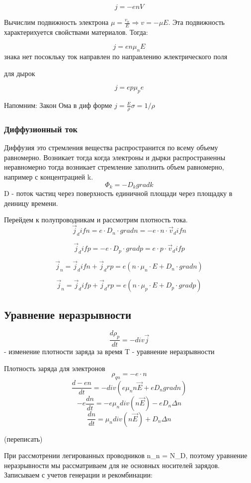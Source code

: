\documentclass[../main.tex]{subfiles}
\begin{document}
\[j = -e n V\]

Вычислим подвижность электрона $\mu = \frac{v_n}{E} \Rightarrow v = - \mu E$. Эта подвижность характерихуется свойствами материалов. Тогда:

\[j = e n \mu_n E\] 
знака нет посокльку ток направлен по направлению жлектрического поля

для дырок

\[j = e p \mu_p e\]

Напомним: Закон Ома в диф форме $j = \frac{E}{\rho} \sigma = 1/\rho$

\subsubsection{Диффузионный ток}
Диффузия это стремления вещества распространится по всему объему равномерно. Возникает тогда когда электроны и дырки распространенны неравномерно
тогда возникает стремление заполнить объем равномерно, например с концентрацией k.
\[\Phi_k = -D_k grad k\]
D - поток частиц через поверхность единичной площади через площадку в деиницу времени.

Перейдем к полупроводникам и рассмотрим плотность тока.
\[\vec j_difn = e \cdot D_n \cdot grad n = -e \cdot n \cdot \vec v_difn \]

\[\vec j_difp = - e \cdot D_p \cdot grad p = e \cdot p \cdot \vec v_difp\]

\[\vec j_n = \vec j_difn + \vec j_drp = e(n \cdot \mu_n \cdot E + D_n \cdot grad n)\]

\[\vec j_n = \vec j_difp + \vec j_drp = e(n \cdot \mu_p \cdot E + D_p \cdot grad p)\]

\subsection{Уравнение неразрывности}
\[\frac{d \rho_p}{d t} = -div \vec j\]
- изменение плотности заряда за время T - уравнение неразрывности

Плотность заряда для электронов
\[\rho_{qn} = - e \cdot n\]
\[\frac{d -en}{d t} = -div(e \mu_n n \vec E + e D_n grad n)\]
\[-e \frac{d n}{d t} = -e \mu_n div(n \vec E) - eD_n \Delta n\]
\[\frac{d n}{d t} = \mu_n div(n \vec E) + D_n \Delta n\]

(переписать)

При рассмотрении легированных проводников n_n = N_D, поэтому уравнение неразрывности мы рассматриваем для не основных носителей зарядов.
Записываем с учетов генерации и рекомбинации:
\end{document}
